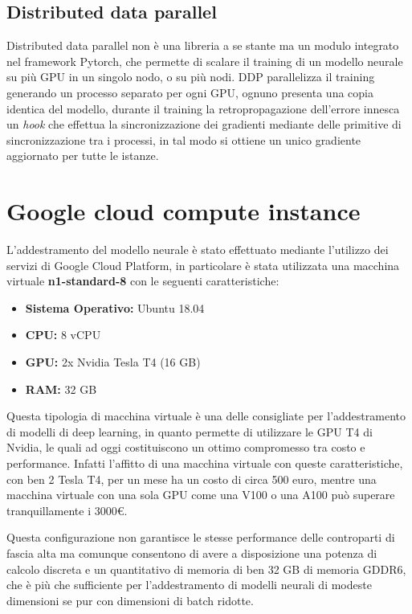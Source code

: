 \subsection{Distributed data parallel}
Distributed data parallel non è una libreria a se stante ma un modulo integrato nel framework Pytorch,
che permette di scalare il training di un modello neurale su più GPU in un singolo nodo, o su più nodi.
DDP parallelizza il training generando un processo separato per ogni GPU, ognuno presenta
una copia identica del modello, durante il training la retropropagazione dell'errore innesca un \textit{hook} che effettua la 
sincronizzazione dei gradienti mediante delle primitive di sincronizzazione tra i processi, in tal modo 
si ottiene un unico gradiente aggiornato per tutte le istanze.

\section{Google cloud compute instance\ok}
L'addestramento del modello neurale è stato effettuato mediante l'utilizzo dei servizi di Google Cloud Platform, 
in particolare è stata utilizzata una macchina virtuale \textbf{n1-standard-8} con le seguenti caratteristiche:

\begin{itemize}
    \item \textbf{Sistema Operativo:} Ubuntu 18.04
    \item \textbf{CPU:} 8 vCPU
    \item \textbf{GPU:} 2x Nvidia Tesla T4 (16 GB)
    \item \textbf{RAM:} 32 GB 
\end{itemize}

Questa tipologia di macchina virtuale è una delle consigliate per l'addestramento di modelli di deep learning, in quanto permette di utilizzare
le GPU T4 di Nvidia, le quali ad oggi costituiscono un ottimo compromesso tra costo e performance. Infatti l'affitto di una macchina
virtuale con queste caratteristiche, con ben 2 Tesla T4, per un mese ha un costo di circa 500 euro, mentre una macchina virtuale con una sola GPU 
come una V100 o una A100 può superare tranquillamente i 3000€.

Questa configurazione non garantisce le stesse performance delle controparti di fascia alta ma comunque consentono di avere a disposizione
una potenza di calcolo discreta e un quantitativo di memoria di ben 32 GB di memoria GDDR6, che è più che sufficiente per l'addestramento di modelli
neurali di modeste dimensioni se pur con dimensioni di batch ridotte.

